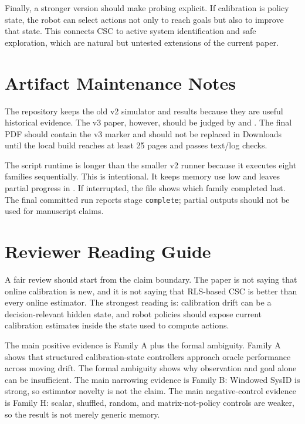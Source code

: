 \documentclass{article}
\begin{document}
Finally, a stronger version should make probing explicit. If calibration is
policy state, the robot can select actions not only to reach goals but also to
improve that state. This connects CSC to active system identification and safe
exploration, which are natural but untested extensions of the current paper.

\section{Artifact Maintenance Notes}

The repository keeps the old v2 simulator and results because they are useful
historical evidence. The v3 paper, however, should be judged by
 and .
The final PDF should contain the v3 marker and should not be replaced in
Downloads until the local build reaches at least 25 pages and passes text/log
checks.

The script runtime is longer than the smaller v2 runner because it executes
eight families sequentially. This is intentional. It keeps memory use low and
leaves partial progress in . If interrupted, the file shows
which family completed last. The final committed run reports stage
\texttt{complete}; partial outputs should not be used for manuscript claims.

\section{Reviewer Reading Guide}

A fair review should start from the claim boundary. The paper is not saying
that online calibration is new, and it is not saying that RLS-based CSC is
better than every online estimator. The strongest reading is: calibration drift
can be a decision-relevant hidden state, and robot policies should expose
current calibration estimates inside the state used to compute actions.

The main positive evidence is Family A plus the formal ambiguity. Family A
shows that structured calibration-state controllers approach oracle
performance across moving drift. The formal ambiguity shows why observation and
goal alone can be insufficient. The main narrowing evidence is Family B:
Windowed SysID is strong, so estimator novelty is not the claim. The main
negative-control evidence is Family H: scalar, shuffled, random, and
matrix-not-policy controls are weaker, so the result is not merely generic
memory.
\end{document}

